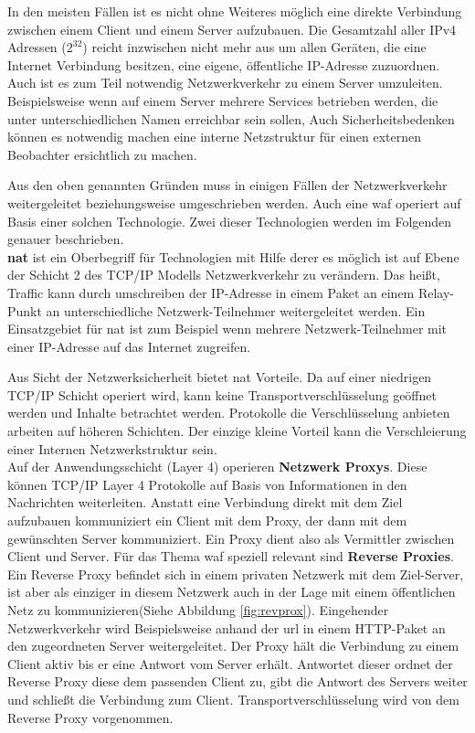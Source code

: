 In den meisten Fällen ist es nicht ohne Weiteres möglich eine direkte Verbindung zwischen einem Client und einem Server aufzubauen.
Die Gesamtzahl aller IPv4 Adressen ($2^{32}$) reicht inzwischen nicht mehr aus um allen Geräten, die eine Internet Verbindung besitzen, eine eigene, öffentliche IP-Adresse zuzuordnen.
Auch ist es zum Teil notwendig Netzwerkverkehr zu einem Server umzuleiten.
Beispielsweise wenn auf einem Server mehrere Services betrieben werden, die unter unterschiedlichen Namen erreichbar sein sollen,
Auch Sicherheitsbedenken können es notwendig machen eine interne Netzstruktur für einen externen Beobachter ersichtlich zu machen.

Aus den oben genannten Gründen muss in einigen Fällen der Netzwerkverkehr weitergeleitet beziehungsweise umgeschrieben werden.
Auch eine \ac{waf} operiert auf Basis einer solchen Technologie.
Zwei dieser Technologien werden im Folgenden genauer beschrieben.\\

\textbf{\ac{nat}} ist ein Oberbegriff für Technologien mit Hilfe derer es möglich ist auf Ebene der Schicht 2 des TCP/IP Modells Netzwerkverkehr zu verändern.
Das heißt, Traffic kann durch umschreiben der IP-Adresse in einem Paket an einem Relay-Punkt an unterschiedliche Netzwerk-Teilnehmer weitergeleitet werden.
Ein Einsatzgebiet für \ac{nat} ist zum Beispiel wenn mehrere Netzwerk-Teilnehmer mit einer IP-Adresse auf das Internet zugreifen.

Aus Sicht der Netzwerksicherheit bietet \ac{nat} Vorteile.
Da auf einer niedrigen TCP/IP Schicht operiert wird, kann keine Transportverschlüsselung geöffnet werden und Inhalte betrachtet werden.
Protokolle die Verschlüsselung anbieten arbeiten auf höheren Schichten.
Der einzige kleine Vorteil kann die Verschleierung einer Internen Netzwerkstruktur sein\cite{NATNetworkAddress}.\\

Auf der Anwendungsschicht (Layer 4) operieren \textbf{Netzwerk Proxys}.
Diese können TCP/IP Layer 4 Protokolle auf Basis von Informationen in den Nachrichten weiterleiten.
Anstatt eine Verbindung direkt mit dem Ziel aufzubauen kommuniziert ein Client mit dem Proxy, der dann mit dem gewünschten Server kommuniziert.
Ein Proxy dient also als Vermittler zwischen Client und Server.
Für das Thema \ac{waf} speziell relevant sind \textbf{Reverse Proxies}.
Ein Reverse Proxy befindet sich in einem privaten Netzwerk mit dem Ziel-Server, ist aber als einziger in diesem Netzwerk auch in der Lage mit einem öffentlichen Netz zu kommunizieren(Siehe Abbildung \ref{fig:revprox}).
Eingehender Netzwerkverkehr wird Beispielsweise anhand der \ac{url} in einem HTTP-Paket an den zugeordneten Server weitergeleitet.
Der Proxy hält die Verbindung zu einem Client aktiv bis er eine Antwort vom Server erhält.
Antwortet dieser ordnet der Reverse Proxy diese dem passenden Client zu, gibt die Antwort des Servers weiter und schließt die Verbindung zum Client.
Transportverschlüsselung wird von dem Reverse Proxy vorgenommen.

